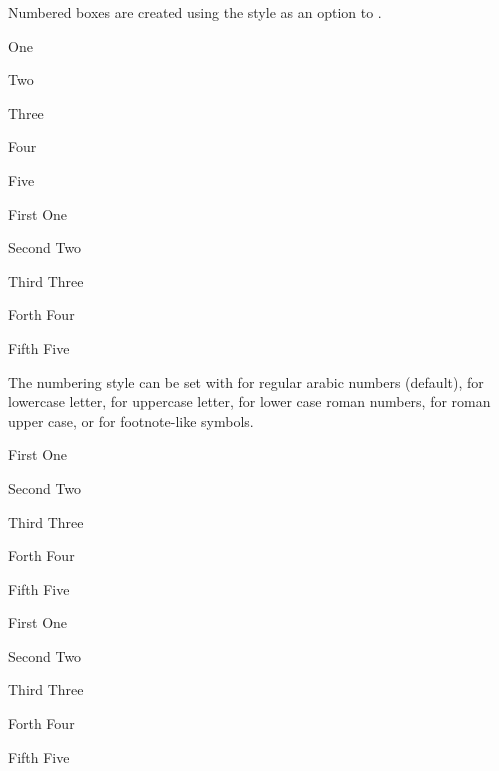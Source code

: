 \documentclass[a4paper, 11pt]{article}
\begin{document}
Numbered boxes are created using the style  as an option to .

\begin{example}{}
    \begin{PLTBoxRaster}[enumerate, width = 0.4\linewidth]
        \item One
        \item Two
        \item Three
        \item Four
        \item Five
    \end{PLTBoxRaster}\hfill%
    \begin{PLTBoxRaster}[enumerate, width = 0.4\linewidth]
        \item [First] One
        \item [Second] Two
        \item [Third] Three
        \item [Forth] Four
        \item [Fifth] Five
    \end{PLTBoxRaster}
\end{example}

The numbering style can be set with  for regular arabic numbers (default),  for lowercase letter,  for uppercase letter,  for lower case roman numbers,  for roman upper case, or  for footnote-like symbols.

\begin{example}{}
    \begin{PLTBoxRaster}[enumerate, Alph, width = 0.4\linewidth]
        \item [First] One
        \item [Second] Two
        \item [Third] Three
        \item [Forth] Four
        \item [Fifth] Five
    \end{PLTBoxRaster}\hfill%
    \begin{PLTBoxRaster}[enumerate, Roman, width = 0.4\linewidth]
        \item [First] One
        \item [Second] Two
        \item [Third] Three
        \item [Forth] Four
        \item [Fifth] Five
    \end{PLTBoxRaster}
\end{example}
\end{document}
